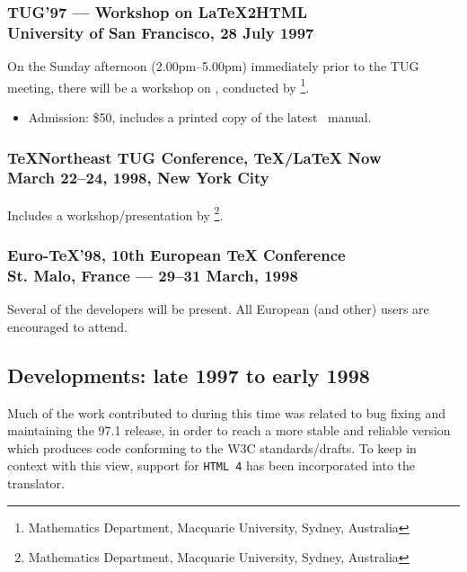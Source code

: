 \vfil

\subsubsection*[center]{TUG'97 --- Workshop on \LaTeX2HTML\\
University of San Francisco, 28 July 1997\label{tug97}}

\noindent
On the Sunday afternoon (2.00pm--5.00pm)
immediately prior to the TUG meeting, there will be a workshop
on \latextohtml, conducted by \RossMoore\footnote{%
Mathematics Department, Macquarie University, Sydney, Australia}.

\begin{itemize}
\item[]
Admission: \$50, includes a printed copy of the latest \latextohtml\ manual.
\end{itemize}

\bigskip

\subsubsection*[center]{\TeX{}Northeast TUG Conference, \TeX/\LaTeX{} Now\\
March 22--24, 1998, New York City}

\noindent
Includes a workshop/presentation by \RossMoore\footnote{%
Mathematics Department, Macquarie University, Sydney, Australia}.


\subsubsection*[center]{Euro-\TeX{}'98, 10th European \TeX{} Conference\\
St. Malo, France --- 29--31 March, 1998}

\noindent
Several of the \latextohtml{} developers will be present.
All European (and other) \latextohtml{} users are encouraged to attend.


\vfil


\subsection*{Developments: late 1997 to early 1998\label{recent98}}%
Much of the work contributed to \latextohtml{} during this time was
related to bug fixing and maintaining the 97.1 release, in order to
reach a more stable and reliable version which produces  code
conforming to the W3C standards/drafts.
To keep in context with this view, support for \texttt{HTML 4} has been
incorporated into the translator.

